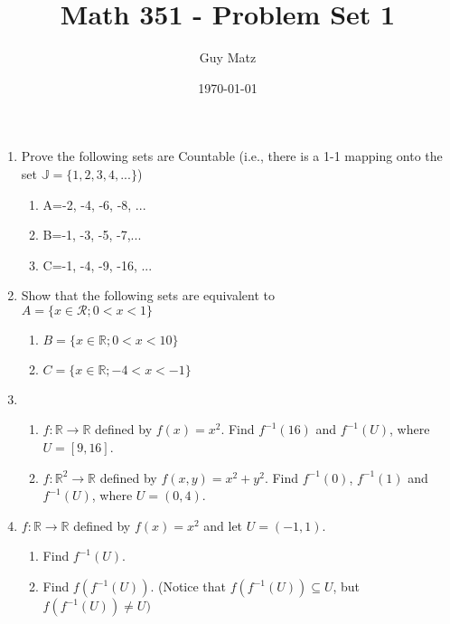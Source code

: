 \documentclass[12pt]{amsart}
\title{\textbf{Math 351 - Problem Set 1}}
\author{Guy Matz}
\date{\today}
\newcommand{\benu}{\begin{enumerate}}
\newcommand{\eenu}{\end{enumerate}}
\theoremstyle{definition}
\newcommand{\mbR}{\mathbb{R}}
\newcommand{\mbJ}{\mathbb{J}}
\newcommand{\mcR}{\mathcal{R}}
\begin{document}
 

\maketitle

\begin{enumerate}[series=p]
\item Prove the following sets are Countable (i.e., there is a 1-1 mapping onto the set $\mbJ=\{1,2,3,4,...\}$)
\benu
	\item A={-2, -4, -6, -8, ...}
	\item B={-1, -3, -5, -7,...}
	\item C={-1, -4, -9, -16, ...}
\eenu

\newpage

\item Show that the following sets are equivalent to \\
$A = \{x \in \mcR; 0 < x < 1\}$
\benu
	\item $B = \{x \in \mbR; 0 < x < 10\}$
	\item $C = \{x \in \mbR; −4 < x < −1\}$
\eenu
\newpage

\item
	\benu
		\item $f: \mbR \to \mbR$ defined by $f(x) = x^2$.  Find $f^{-1}(16)$ and $f^{−1}(U)$, where	$U = [9,16]$.
		\item $f: \mbR^2 \to \mbR$ defined by $f(x,y) = x^2 + y^2$.  Find $f^{-1}(0)$, $f^{-1}(1)$ and $f^{-1}(U)$, where	$U =(0,4)$.
	\eenu
\newpage

\item $f: \mbR \to \mbR$ defined by $f(x) = x^2$ and let $U = (-1,1)$.
	\benu
		\item Find $f^{-1}(U)$.
		\item Find $f(f^{-1}(U))$.  (Notice that $f(f^{-1}(U)) \subseteq U$, but $f(f^{-1}(U)) \neq U)$
	\eenu
\newpage

\end{enumerate}
\end{document}
